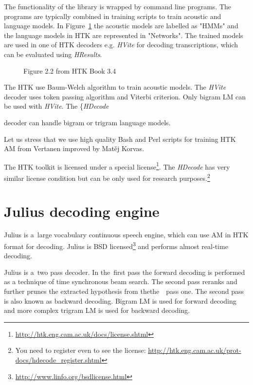 {The functionality of the library is wrapped by command line programs.
The programs are typically combined in training scripts to train acoustic and language models.
In Figure~\ref{fig:htk_tools} the acoustic models are labelled as "HMMs" 
and the language models in \ac{HTK} are represented in "Networks".
The trained models are used in one of \ac{HTK} decoders e.g. {\it HVite}\/ for decoding
transcriptions, which can be evaluated using {\it HResults}.

\begin{figure}[!htp]
    \begin{center}
    
    \caption{Figure 2.2 from HTK Book 3.4\cite{young2006htk}}
    \label{fig:htk_tools} 
    \end{center}
\end{figure}

The \ac{HTK} use Baum-Welch algorithm to train acoustic models.
The {\it HVite} decoder uses token passing algorithm and Viterbi criterion.
\cite{HTKBook3.4} %
Only bigram \ac{LM} can be used with {\it HVite}.
The \{\it HDecode} decoder can handle bigram or trigram language models. 


Let us stress that we use high quality Bash and Perl scripts for training \ac{HTK} \ac{AM}
from Vertanen improved by Matěj Korvas.\cite{vertanen_baseline_2006}\cite{korvas_2014}

The \ac{HTK} toolkit is licensed under a special license\footnote{\url{http://htk.eng.cam.ac.uk/docs/license.shtml}}.
The {\it HDecode} has very similar license condition but can be only used for research purposes.\footnote{You
need to register even to see the license: \url{http://htk.eng.cam.ac.uk/prot-docs/hdecode_register.shtml}}

\section{Julius decoding engine}
\label{sec:back_julius}

Julius is a~large vocabulary continuous speech engine, which can use \ac{AM} in \ac{HTK} format for decoding.\cite{lee2009julius}
Julius is BSD licensed\footnote{\url{http://www.linfo.org/bsdlicense.html}} and performs almost real-time decoding.

Julius is a~two pass decoder. In the~first pass the forward decoding is performed as
a technique of time synchronous beam search.
The second pass reranks and further prunes the extracted hypothesis from thethe~~pass one.
The second pass is also known as backward decoding.
Bigram \ac{LM} is used for forward decoding and more complex trigram \ac{LM} is used for backward decoding.

